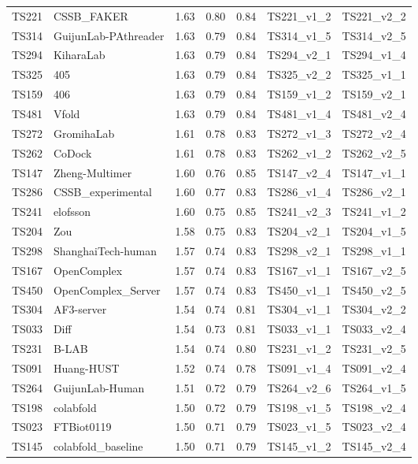 \begin{longtable}{lllllll}
TS221 & CSSB\_FAKER & 1.63 & 0.80 & 0.84 & TS221\_v1\_2 & TS221\_v2\_2 \\ 
TS314 & GuijunLab-PAthreader & 1.63 & 0.79 & 0.84 & TS314\_v1\_5 & TS314\_v2\_5 \\ 
TS294 & KiharaLab & 1.63 & 0.79 & 0.84 & TS294\_v2\_1 & TS294\_v1\_4 \\ 
TS325 & 405 & 1.63 & 0.79 & 0.84 & TS325\_v2\_2 & TS325\_v1\_1 \\ 
TS159 & 406 & 1.63 & 0.79 & 0.84 & TS159\_v1\_2 & TS159\_v2\_1 \\ 
TS481 & Vfold & 1.63 & 0.79 & 0.84 & TS481\_v1\_4 & TS481\_v2\_4 \\ 
TS272 & GromihaLab & 1.61 & 0.78 & 0.83 & TS272\_v1\_3 & TS272\_v2\_4 \\ 
TS262 & CoDock & 1.61 & 0.78 & 0.83 & TS262\_v1\_2 & TS262\_v2\_5 \\ 
TS147 & Zheng-Multimer & 1.60 & 0.76 & 0.85 & TS147\_v2\_4 & TS147\_v1\_1 \\ 
TS286 & CSSB\_experimental & 1.60 & 0.77 & 0.83 & TS286\_v1\_4 & TS286\_v2\_1 \\ 
TS241 & elofsson & 1.60 & 0.75 & 0.85 & TS241\_v2\_3 & TS241\_v1\_2 \\ 
TS204 & Zou & 1.58 & 0.75 & 0.83 & TS204\_v2\_1 & TS204\_v1\_5 \\ 
TS298 & ShanghaiTech-human & 1.57 & 0.74 & 0.83 & TS298\_v2\_1 & TS298\_v1\_1 \\ 
TS167 & OpenComplex & 1.57 & 0.74 & 0.83 & TS167\_v1\_1 & TS167\_v2\_5 \\ 
TS450 & OpenComplex\_Server & 1.57 & 0.74 & 0.83 & TS450\_v1\_1 & TS450\_v2\_5 \\ 
TS304 & AF3-server & 1.54 & 0.74 & 0.81 & TS304\_v1\_1 & TS304\_v2\_2 \\ 
TS033 & Diff & 1.54 & 0.73 & 0.81 & TS033\_v1\_1 & TS033\_v2\_4 \\ 
TS231 & B-LAB & 1.54 & 0.74 & 0.80 & TS231\_v1\_2 & TS231\_v2\_5 \\ 
TS091 & Huang-HUST & 1.52 & 0.74 & 0.78 & TS091\_v1\_4 & TS091\_v2\_4 \\ 
TS264 & GuijunLab-Human & 1.51 & 0.72 & 0.79 & TS264\_v2\_6 & TS264\_v1\_5 \\ 
TS198 & colabfold & 1.50 & 0.72 & 0.79 & TS198\_v1\_5 & TS198\_v2\_4 \\ 
TS023 & FTBiot0119 & 1.50 & 0.71 & 0.79 & TS023\_v1\_5 & TS023\_v2\_4 \\ 
TS145 & colabfold\_baseline & 1.50 & 0.71 & 0.79 & TS145\_v1\_2 & TS145\_v2\_4 \\ 

\end{longtable}
